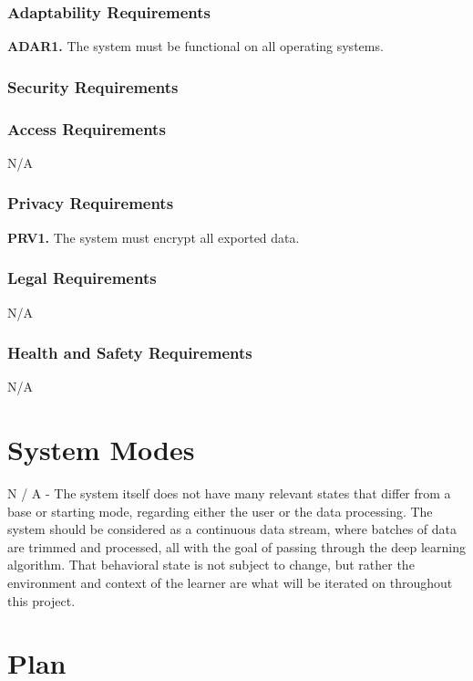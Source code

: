 \documentclass[12pt, titlepage]{article}
\begin{document}
\subsubsection{Adaptability Requirements}
\textbf{ADAR1.} The system must be functional on all operating systems.

\subsubsection{Security Requirements}

\subsubsection{Access Requirements}
N/A

\subsubsection{Privacy Requirements}
\textbf{PRV1.} The system must encrypt all exported data.


\subsubsection{Legal Requirements}
N/A

\subsubsection{Health and Safety Requirements}
N/A


\section{System Modes}
N / A - The system itself does not have many relevant states that differ from a base or starting mode, regarding either the user or the data processing. The system should be considered as a continuous data stream, where batches of data are trimmed and processed, all with the goal of passing through the deep learning algorithm. That behavioral state is not subject to change, but rather the environment and context of the learner are what will be iterated on throughout this project.

\section{Plan}
\end{document}
